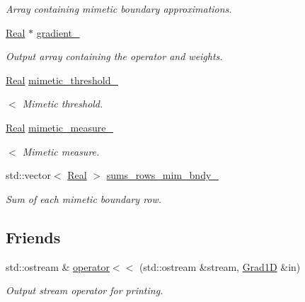 \begin{DoxyCompactItemize}
\begin{DoxyCompactList}\small\item\em Array containing mimetic boundary approximations. \end{DoxyCompactList}\item 
\hyperlink{group__c01-roots_gac080bbbf5cbb5502c9f00405f894857d}{Real} $\ast$ \hyperlink{classmtk_1_1Grad1D_a024b84b1ea285c0c590eb42d40ff4469}{gradient\+\_\+}
\begin{DoxyCompactList}\small\item\em Output array containing the operator and weights. \end{DoxyCompactList}\item 
\hyperlink{group__c01-roots_gac080bbbf5cbb5502c9f00405f894857d}{Real} \hyperlink{classmtk_1_1Grad1D_aa944a99bcd2daab1af11da4c3c6b5504}{mimetic\+\_\+threshold\+\_\+}
\begin{DoxyCompactList}\small\item\em $<$ Mimetic threshold. \end{DoxyCompactList}\item 
\hyperlink{group__c01-roots_gac080bbbf5cbb5502c9f00405f894857d}{Real} \hyperlink{classmtk_1_1Grad1D_afd225bdae37980908c9abf22dda067cd}{mimetic\+\_\+measure\+\_\+}
\begin{DoxyCompactList}\small\item\em $<$ Mimetic measure. \end{DoxyCompactList}\item 
std\+::vector$<$ \hyperlink{group__c01-roots_gac080bbbf5cbb5502c9f00405f894857d}{Real} $>$ \hyperlink{classmtk_1_1Grad1D_ab8858a35339ed7036083d25b23293737}{sums\+\_\+rows\+\_\+mim\+\_\+bndy\+\_\+}
\begin{DoxyCompactList}\small\item\em Sum of each mimetic boundary row. \end{DoxyCompactList}\end{DoxyCompactItemize}
\subsection*{Friends}
\begin{DoxyCompactItemize}
\item 
std\+::ostream \& \hyperlink{classmtk_1_1Grad1D_aeba97883d95c0b4546a98bebe8ef3106}{operator$<$$<$} (std\+::ostream \&stream, \hyperlink{classmtk_1_1Grad1D}{Grad1\+D} \&in)
\begin{DoxyCompactList}\small\item\em Output stream operator for printing. \end{DoxyCompactList}\end{DoxyCompactItemize}


